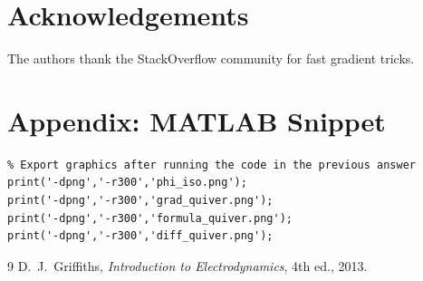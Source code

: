 \documentclass[12pt]{article}
\begin{document}
\section*{Acknowledgements}
The authors thank the StackOverflow community for fast gradient tricks.

\section*{Appendix: MATLAB Snippet}
{\small
\begin{verbatim}
% Export graphics after running the code in the previous answer
print('-dpng','-r300','phi_iso.png');
print('-dpng','-r300','grad_quiver.png');
print('-dpng','-r300','formula_quiver.png');
print('-dpng','-r300','diff_quiver.png');
\end{verbatim}
}


\begin{thebibliography}{9}
D.~J.~Griffiths, \emph{Introduction to Electrodynamics}, 4th ed., 2013.
\end{thebibliography}
\end{document}
